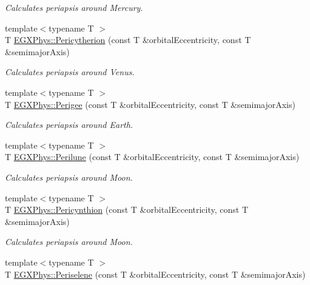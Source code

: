 \begin{DoxyCompactItemize}
\begin{DoxyCompactList}\small\item\em Calculates periapsis around Mercury. \end{DoxyCompactList}\item 
{\footnotesize template$<$typename T $>$ }\\T \mbox{\hyperlink{group___e_g_x_phys-_periapsis_gaa270e364cbbd7d3d6212872df484926f}{E\+G\+X\+Phys\+::\+Pericytherion}} (const T \&orbital\+Eccentricity, const T \&semimajor\+Axis)
\begin{DoxyCompactList}\small\item\em Calculates periapsis around Venus. \end{DoxyCompactList}\item 
{\footnotesize template$<$typename T $>$ }\\T \mbox{\hyperlink{group___e_g_x_phys-_periapsis_gae2d053caf69cb0b4c3207064a2ab143a}{E\+G\+X\+Phys\+::\+Perigee}} (const T \&orbital\+Eccentricity, const T \&semimajor\+Axis)
\begin{DoxyCompactList}\small\item\em Calculates periapsis around Earth. \end{DoxyCompactList}\item 
{\footnotesize template$<$typename T $>$ }\\T \mbox{\hyperlink{group___e_g_x_phys-_periapsis_ga2cc7ab05e18d32c94d8d74972e032793}{E\+G\+X\+Phys\+::\+Perilune}} (const T \&orbital\+Eccentricity, const T \&semimajor\+Axis)
\begin{DoxyCompactList}\small\item\em Calculates periapsis around Moon. \end{DoxyCompactList}\item 
{\footnotesize template$<$typename T $>$ }\\T \mbox{\hyperlink{group___e_g_x_phys-_periapsis_gaeeba153b188cd06cbd233eaef12f0a6a}{E\+G\+X\+Phys\+::\+Pericynthion}} (const T \&orbital\+Eccentricity, const T \&semimajor\+Axis)
\begin{DoxyCompactList}\small\item\em Calculates periapsis around Moon. \end{DoxyCompactList}\item 
{\footnotesize template$<$typename T $>$ }\\T \mbox{\hyperlink{group___e_g_x_phys-_periapsis_ga255874374dde571531e443cdbef9ef0c}{E\+G\+X\+Phys\+::\+Periselene}} (const T \&orbital\+Eccentricity, const T \&semimajor\+Axis)

\end{DoxyCompactItemize}
